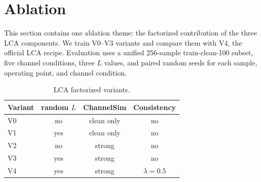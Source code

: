 \documentclass[10pt,twocolumn]{article}
\begin{document}
\begin{table}[t]
\centering
\caption{Three-client TCP prototype measurement. RTF entries are mean / worst endpoint mean.}
\label{tab:prototype}
\small
{}
\end{table}

\section{Ablation}

This section contains one ablation theme: the factorized contribution of the three LCA components. We train V0--V3 variants and compare them with V4, the official LCA recipe. Evaluation uses a unified 256-sample train-clean-100 subset, five channel conditions, three \(L\) values, and paired random seeds for each sample, operating point, and channel condition.

\begin{table}[t]
\centering
\caption{LCA factorized variants.}
\label{tab:variants}
\small
\begin{tabular}{lccc}
\toprule
Variant & random \(L\) & ChannelSim & Consistency \\
\midrule
V0 & no & clean only & no \\
V1 & yes & clean only & no \\
V2 & no & strong & no \\
V3 & yes & strong & no \\
V4 & yes & strong & \(\lambda=0.5\) \\
\bottomrule
\end{tabular}
\end{table}
\end{document}
